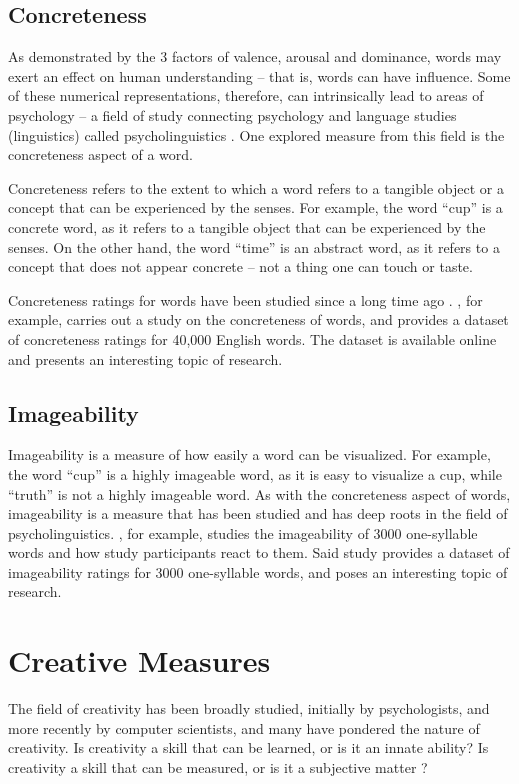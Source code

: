 \subsection{Concreteness}
As demonstrated by the 3 factors of valence, arousal and dominance, words may exert an effect on human understanding -- that is, words can have influence. Some of these numerical representations, therefore, can intrinsically lead to areas of psychology -- a field of study connecting psychology and language studies (linguistics) called psycholinguistics \cite{tausczik_psychological_2010}. One explored measure from this field is the concreteness aspect of a word. 

Concreteness refers to the extent to which a word refers to a tangible object or a concept that can be experienced by the senses. For example, the word ``cup'' is a concrete word, as it refers to a tangible object that can be experienced by the senses. On the other hand, the word ``time'' is an abstract word, as it refers to a concept that does not appear concrete -- not a thing one can touch or taste. 

Concreteness ratings for words have been studied since a long time ago \cite{brysbaert2014concreteness}.
\cite{brysbaert2014concreteness}, for example, carries out a study on the concreteness of words, and provides a dataset of concreteness ratings for 40,000 English words. The dataset is available online and presents an interesting topic of research. 

\subsection{Imageability}
Imageability is a measure of how easily a word can be visualized. For example, the word ``cup'' is a highly imageable word, as it is easy to visualize a cup, while ``truth'' is not a highly imageable word. As with the concreteness aspect of words, imageability is a measure that has been studied and has deep roots in the field of psycholinguistics. \cite{cortese_imageability_2004}, for example, studies the imageability of 3000 one-syllable words and how study participants react to them. Said study provides a dataset of imageability ratings for 3000 one-syllable words, and poses an interesting topic of research.

\section{Creative Measures}
The field of creativity has been broadly studied, initially by psychologists, and more recently by computer scientists, and many have pondered the nature of creativity. Is creativity a skill that can be learned, or is it an innate ability? Is creativity a skill that can be measured, or is it a subjective matter \citep{cropley2003creativitytests}?

